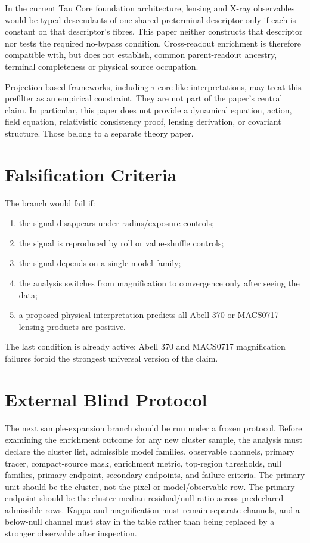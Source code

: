 \documentclass[11pt,a4paper]{article}
\begin{document}
In the current Tau Core foundation architecture, lensing and X-ray observables
would be typed descendants of one shared preterminal descriptor only if each
is constant on that descriptor's fibres.  This paper neither constructs that
descriptor nor tests the required no-bypass condition.  Cross-readout
enrichment is therefore compatible with, but does not establish, common
parent-readout ancestry, terminal completeness or physical source occupation.

Projection-based frameworks, including \(\tau\)-core-like interpretations, may
treat this prefilter as an empirical constraint. They are not part of the
paper's central claim. In particular, this paper does not provide a dynamical
equation, action, field equation, relativistic consistency proof, lensing
derivation, or covariant structure. Those belong to a separate theory paper.

\section{Falsification Criteria}

The branch would fail if:
\begin{enumerate}[leftmargin=*]
\item the signal disappears under radius/exposure controls;
\item the signal is reproduced by roll or value-shuffle controls;
\item the signal depends on a single model family;
\item the analysis switches from magnification to convergence only after seeing
the data;
\item a proposed physical interpretation predicts all Abell 370 or MACS0717 lensing products
are positive.
\end{enumerate}
The last condition is already active: Abell 370 and MACS0717 magnification
failures forbid the strongest universal version of the claim.

\section{External Blind Protocol}

The next sample-expansion branch should be run under a frozen protocol. Before
examining the enrichment outcome for any new cluster sample, the analysis must
declare the cluster list, admissible model families, observable channels,
primary tracer, compact-source mask, enrichment metric, top-region thresholds,
null families, primary endpoint, secondary endpoints, and failure criteria.
The primary unit should be the cluster, not the pixel or model/observable row.
The primary endpoint should be the cluster median residual/null ratio across
predeclared admissible rows. Kappa and magnification must remain separate
channels, and a below-null channel must stay in the table rather than being
replaced by a stronger observable after inspection.
\end{document}
